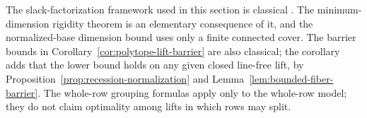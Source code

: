 The slack-factorization framework used in this section is classical
\cite{GPT2013}. The minimum-dimension rigidity theorem is an elementary
consequence of it, and the normalized-base dimension bound uses only a
finite connected cover. The barrier bounds in
Corollary~\ref{cor:polytope-lift-barrier} are also classical; the
corollary adds that the lower bound holds on any given closed line-free
lift, by Proposition~\ref{prop:recession-normalization} and
Lemma~\ref{lem:bounded-fiber-barrier}. The whole-row grouping formulas
apply only to the whole-row model; they do not claim optimality among
lifts in which rows may split.
